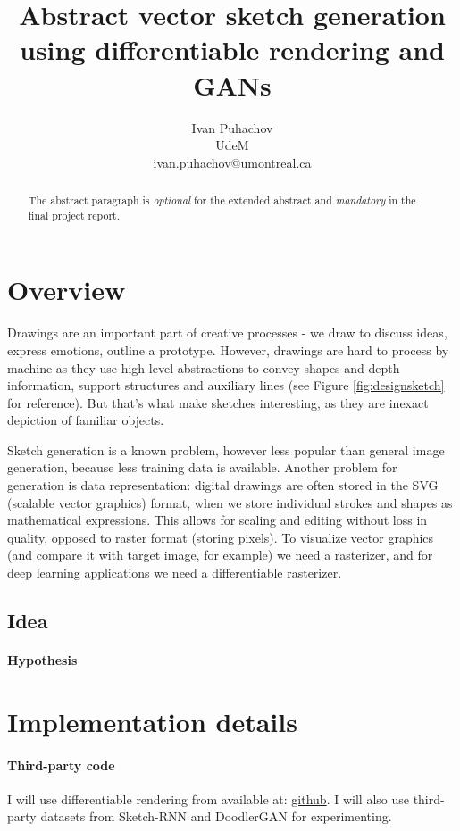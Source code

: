 \documentclass{article}
\title{Abstract vector sketch generation using differentiable rendering and GANs}
\author{
   Ivan Puhachov \\ 
   UdeM \\
   ivan.puhachov@umontreal.ca \\
}
\begin{document}
\maketitle

\begin{abstract}
  The abstract paragraph is \emph{optional} for the extended abstract and \emph{mandatory} in the final project report.
\end{abstract}

\section{Overview}
Drawings are an important part of creative processes - we draw to discuss ideas, express emotions, outline a prototype. However, drawings are hard to process by machine as they use high-level abstractions to convey shapes and depth information, support structures and auxiliary lines (see Figure \ref{fig:designsketch} for reference). But that's what make sketches interesting, as they are inexact depiction of familiar objects.

Sketch generation is a known problem, however less popular than general image generation, because less training data is available. Another problem for generation is data representation: digital drawings are often stored in the SVG (scalable vector graphics) format, when we store individual strokes and shapes as mathematical expressions. This allows for scaling and editing without loss in quality, opposed to raster format (storing pixels). To visualize vector graphics (and compare it with target image, for example) we need a rasterizer, and for deep learning applications we need a differentiable rasterizer. 





\subsection{Idea}

\paragraph{Hypothesis}

\section{Implementation details}

\paragraph{Third-party code} I will use differentiable rendering from \cite{diffsvg} available at: \href{https://github.com/BachiLi/diffvg}{github}. I will also use third-party datasets from Sketch-RNN \cite{sketchrnn} and DoodlerGAN \cite{doodlergan} for experimenting.
\end{document}
